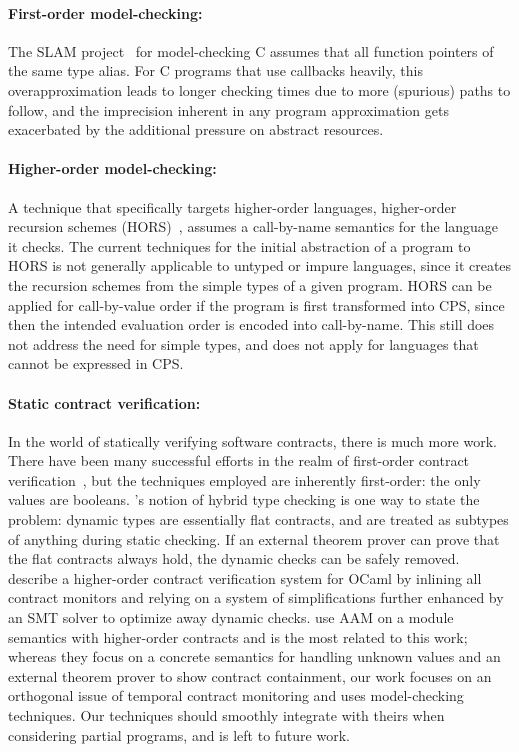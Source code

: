 \documentclass[preprint,onecolumn,9pt]{sigplanconf} %
\begin{document}
\paragraph{First-order model-checking:}{
The SLAM project~\citep{ianjohnson:Ball:2002:SLP:503272.503274} for model-checking C assumes that all function pointers of the same type alias.
%
For C programs that use callbacks heavily, this overapproximation leads to longer checking times due to more (spurious) paths to follow, and the imprecision inherent in any program approximation gets exacerbated by the additional pressure on abstract resources.
}
\paragraph{Higher-order model-checking:}{
A technique that specifically targets higher-order languages, higher-order recursion schemes (HORS)~\citep{ianjohnson:Knapik:2002:HPT:646794.704852}, assumes a call-by-name semantics for the language it checks.
%
The current techniques for the initial abstraction of a program to HORS is not generally applicable to untyped or impure languages, since it creates the recursion schemes from the simple types of a given program.
%
HORS can be applied for call-by-value order if the program is first transformed into CPS, since then the intended evaluation order is encoded into call-by-name.
%
This still does not address the need for simple types, and does not apply for languages that cannot be expressed in CPS.
}
\paragraph{Static contract verification:}{
In the world of statically verifying software contracts, there is much more work.
%
There have been many successful efforts in the realm of first-order contract verification~\citep{ianjohnson:fahndrich:contracts:2011,ianjohnson:vcc:2009}, but the techniques employed are inherently first-order: the only values are booleans.
%
\citet{ianjohnson:Flanagan:2006:HTC:1111037.1111059}'s notion of hybrid type checking is one way to state the problem: dynamic types are essentially flat contracts, and are treated as subtypes of anything during static checking.
%
If an external theorem prover can prove that the flat contracts always hold, the dynamic checks can be safely removed.
%
\citet{dvanhorn:Xu2012Hybrid} describe a higher-order contract verification system for OCaml by inlining all contract monitors and relying on a system of simplifications further enhanced by an SMT solver to optimize away dynamic checks.
%
\citet{dvanhorn:TobinHochstadt2012Higherorder} use AAM on a module semantics with higher-order contracts and is the most related to this work; whereas they focus on a concrete semantics for handling unknown values and an external theorem prover to show contract containment, our work focuses on an orthogonal issue of temporal contract monitoring and uses model-checking techniques.
%
Our techniques should smoothly integrate with theirs when considering partial programs, and is left to future work.
}
\end{document}
